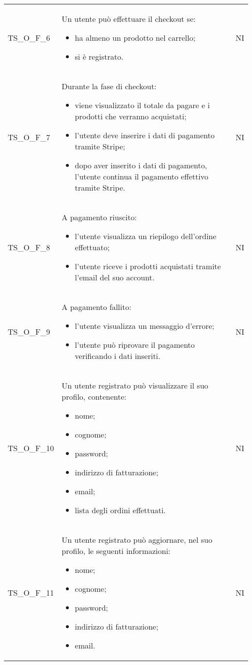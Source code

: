 {\begin{longtable}{C{3cm} C{10.2cm} C{1.5cm}}
TS\_O\_F\_6 & Un utente può effettuare il checkout se:
\begin{itemize}
	\item ha almeno un prodotto nel carrello;
	\item si è registrato.
\end{itemize}
& NI\\

TS\_O\_F\_7 & Durante la fase di checkout:
\begin{itemize}
	\item viene visualizzato il totale da pagare e i prodotti che verranno acquistati;
	\item l'utente deve inserire i dati di pagamento tramite Stripe;
	\item dopo aver inserito i dati di pagamento, l'utente continua il pagamento effettivo tramite Stripe.
\end{itemize}
& NI\\

TS\_O\_F\_8 & A pagamento riuscito:
\begin{itemize}
	\item l'utente visualizza un riepilogo dell'ordine effettuato;
	\item l'utente riceve i prodotti acquistati tramite l'email del suo account.
\end{itemize}
& NI\\

TS\_O\_F\_9 & A pagamento fallito:
\begin{itemize}
	\item l'utente visualizza un messaggio d'errore;
	\item l'utente può riprovare il pagamento verificando i dati inseriti.
\end{itemize}
& NI\\


TS\_O\_F\_10 & Un utente registrato può visualizzare il suo profilo, contenente:
\begin{itemize}
	\item nome;
	\item cognome;
	\item password;
	\item indirizzo di fatturazione;
	\item email;
	\item lista degli ordini effettuati.
\end{itemize}
& NI\\

TS\_O\_F\_11 & Un utente registrato può aggiornare, nel suo profilo, le seguenti informazioni:
\begin{itemize}
	\item nome;
	\item cognome;
	\item password;
	\item indirizzo di fatturazione;
	\item email.
\end{itemize}
& NI\\


\end{longtable}}
